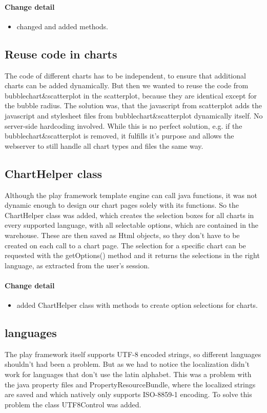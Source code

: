 \paragraph{Change detail}
\begin{itemize}
  \item changed and added methods.
\end{itemize}

\pagebreak[4]
\subsection{Reuse code in charts}
The code of different charts has to be independent, to ensure that additional charts can be added dynamically.
But then we wanted to reuse the code from bubblechart\&scatterplot in the scatterplot,
 because they are identical except for the bubble radius. 
The solution was, that the javascript from scatterplot adds the javascript and stylesheet files 
from bubblechart\&scatterplot dynamically itself. 
No server-side hardcoding involved. While this is no perfect solution, e.g. if the bubblechart\&scatterplot is removed,
it fulfills it's purpose and allows the webserver to still handle all chart types and files the same way.


\subsection{ChartHelper class}
Although the play framework template engine can call java functions, it was not dynamic enough to design our chart pages solely with its functions.
So the ChartHelper class was added, which creates the selection boxes for all charts in every supported language, 
with all selectable options, which are contained in the warehouse.
These are then saved as Html objects, so they don't have to be created on each call to a chart page.
The selection for a specific chart can be requested with the getOptions() method and it returns the selections in the right language,
as extracted from the user's session.

\paragraph{Change detail}
\begin{itemize}
  \item added ChartHelper class with methods to create option selections for charts.
\end{itemize}

\subsection{languages}
The play framework itself supports UTF-8 encoded strings, so different languages shouldn't had been a problem. 
But as we had to notice the localization didn't work for languages that don't use the latin alphabet.
This was a problem with the java property files and PropertyResourceBundle, where the localized strings are saved and which natively only
supports ISO-8859-1 encoding.
To solve this problem the class UTF8Control was added.

